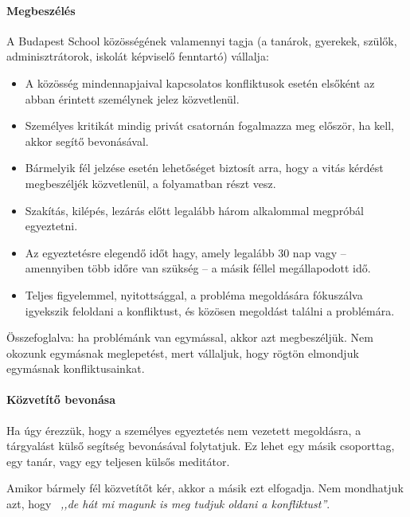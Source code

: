 \paragraph{Megbeszélés}

A Budapest School közösségének valamennyi tagja (a tanárok, gyerekek,
szülők, adminisztrátorok, iskolát képviselő fenntartó) vállalja:

\begin{itemize}

      \item A közösség mindennapjaival kapcsolatos konfliktusok esetén elsőként
            az
            abban érintett személynek jelez közvetlenül.
      \item Személyes kritikát mindig privát csatornán fogalmazza meg először,
            ha
            kell, akkor segítő bevonásával.
      \item   Bármelyik fél jelzése esetén lehetőséget biztosít
            arra, hogy a vitás kérdést megbeszéljék közvetlenül, a folyamatban
            részt vesz.
      \item
            Szakítás, kilépés, lezárás előtt legalább három alkalommal
            megpróbál
            egyeztetni.
      \item
            Az egyeztetésre elegendő időt hagy, amely legalább 30 nap vagy --
            amennyiben több időre van szükség -- a másik féllel megállapodott
            idő.
      \item
            Teljes figyelemmel, nyitottsággal, a probléma megoldására
            fókuszálva
            igyekszik feloldani a konfliktust, és közösen megoldást találni a
            problémára.
\end{itemize}

Összefoglalva: ha problémánk van egymással, akkor azt megbeszéljük. Nem
okozunk egymásnak meglepetést, mert vállaljuk, hogy rögtön elmondjuk
egymásnak konfliktusainkat.

\paragraph{Közvetítő bevonása}

Ha úgy érezzük, hogy a személyes egyeztetés nem vezetett megoldásra, a
tárgyalást külső segítség bevonásával folytatjuk. Ez lehet egy másik
csoporttag, egy tanár, vagy egy teljesen külsős meditátor.

Amikor bármely fél közvetítőt kér, akkor a másik ezt elfogadja. Nem mondhatjuk
azt, hogy  \emph{,,de hát mi magunk is meg tudjuk oldani a konfliktust''}.

